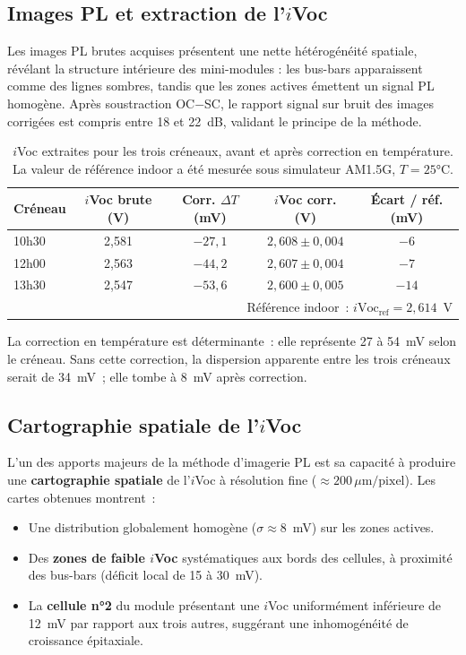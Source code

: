 \documentclass[12pt,a4paper]{report}
\begin{document}
\subsection{Images PL et extraction de l'$i$Voc}

Les images PL brutes acquises présentent une nette hétérogénéité spatiale, révélant la structure intérieure des mini-modules : les bus-bars apparaissent comme des lignes sombres, tandis que les zones actives émettent un signal PL homogène. Après soustraction OC$-$SC, le rapport signal sur bruit des images corrigées est compris entre 18 et 22~dB, validant le principe de la méthode.

\begin{table}[H]
\centering
\caption{$i$Voc extraites pour les trois créneaux, avant et après correction en température. La valeur de référence indoor a été mesurée sous simulateur AM1.5G, $T = 25$°C.}
\label{tab:iVoc}
\begin{tabularx}{0.96\textwidth}{Xcccc}
\toprule
Créneau & $i$Voc brute (V) & Corr. $\Delta T$ (mV) & $i$Voc corr. (V) & Écart / réf. (mV) \\
\midrule
10h30 & 2,581 & $-27{,}1$ & $2{,}608 \pm 0{,}004$ & $-6$ \\
12h00 & 2,563 & $-44{,}2$ & $2{,}607 \pm 0{,}004$ & $-7$ \\
13h30 & 2,547 & $-53{,}6$ & $2{,}600 \pm 0{,}005$ & $-14$ \\
\bottomrule
\multicolumn{5}{r}{\small Référence indoor~: $i\text{Voc}_\text{ref} = 2{,}614$~V}
\end{tabularx}
\end{table}

\noindent
La correction en température est déterminante~: elle représente 27 à 54~mV selon le créneau. Sans cette correction, la dispersion apparente entre les trois créneaux serait de 34~mV~; elle tombe à 8~mV après correction.

\subsection{Cartographie spatiale de l'$i$Voc}

L'un des apports majeurs de la méthode d'imagerie PL est sa capacité à produire une \textbf{cartographie spatiale} de l'$i$Voc à résolution fine ($\approx 200\,\mu\text{m/pixel}$). Les cartes obtenues montrent~:

\begin{itemize}
  \item Une distribution globalement homogène ($\sigma \approx 8$~mV) sur les zones actives.
  \item Des \textbf{zones de faible $i$Voc} systématiques aux bords des cellules, à proximité des bus-bars (déficit local de 15 à 30~mV).
  \item La \textbf{cellule n°2} du module présentant une $i$Voc uniformément inférieure de 12~mV par rapport aux trois autres, suggérant une inhomogénéité de croissance épitaxiale.
\end{itemize}
\end{document}
